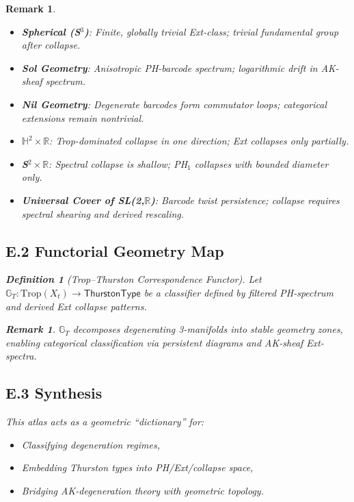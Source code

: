 \documentclass[11pt]{article}
\newtheorem{definition}[theorem]{Definition}
\newtheorem{remark}[theorem]{Remark}
\begin{document}
\begin{remark}
\begin{itemize}
  \item \textbf{Spherical (S$^3$)}:  
  Finite, globally trivial Ext-class; trivial fundamental group after collapse.

  \item \textbf{Sol Geometry}:  
  Anisotropic PH-barcode spectrum; logarithmic drift in AK-sheaf spectrum.

  \item \textbf{Nil Geometry}:  
  Degenerate barcodes form commutator loops; categorical extensions remain nontrivial.

  \item \textbf{$\mathbb{H}^2 \times \mathbb{R}$}:  
  Trop-dominated collapse in one direction; Ext collapses only partially.

  \item \textbf{S$^2 \times \mathbb{R}$}:  
  Spectral collapse is shallow; PH$_1$ collapses with bounded diameter only.

  \item \textbf{Universal Cover of SL(2,$\mathbb{R}$)}:  
  Barcode twist persistence; collapse requires spectral shearing and derived rescaling.
\end{itemize}

\subsection*{E.2 Functorial Geometry Map}

\begin{definition}[Trop--Thurston Correspondence Functor]
Let $\mathbb{G}_T: \mathrm{Trop}(X_t) \to \mathsf{ThurstonType}$  
be a classifier defined by filtered PH-spectrum and derived Ext collapse patterns.
\end{definition}

\begin{remark}
$\mathbb{G}_T$ decomposes degenerating 3-manifolds into stable geometry zones,  
enabling categorical classification via persistent diagrams and AK-sheaf Ext-spectra.
\end{remark}

\subsection*{E.3 Synthesis}

This atlas acts as a geometric “dictionary” for:
\begin{itemize}
    \item Classifying degeneration regimes,
    \item Embedding Thurston types into PH/Ext/collapse space,
    \item Bridging AK-degeneration theory with geometric topology.
\end{itemize}


\end{remark}
\end{document}
